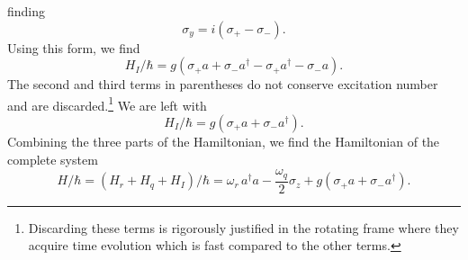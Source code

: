 finding \begin{equation}
\sigma_y = i \left( \sigma_+ - \sigma_- \right) . \end{equation}
Using this form, we find \begin{equation}
H_I/\hbar = g \left(\sigma_+ a + \sigma_- a^{\dagger} - \sigma_+ a^{\dagger} - \sigma_- a \right) . \end{equation}
The second and third terms in parentheses do not conserve excitation number and are discarded.\footnote{Discarding these terms is rigorously justified in the rotating frame where they acquire time evolution which is fast compared to the other terms.}
We are left with \begin{equation}
H_I/\hbar = g \left( \sigma_+ a + \sigma_- a^{\dagger} \right). \end{equation}
Combining the three parts of the Hamiltonian, we find the Hamiltonian of the complete system \begin{equation}
H/\hbar = \left( H_r + H_q + H_I \right)/\hbar = \omega_r\,a^{\dagger}a - \frac{\omega_q}{2} \sigma_z + g\left( \sigma_+ a + \sigma_- a^{\dagger} \right). \end{equation}

